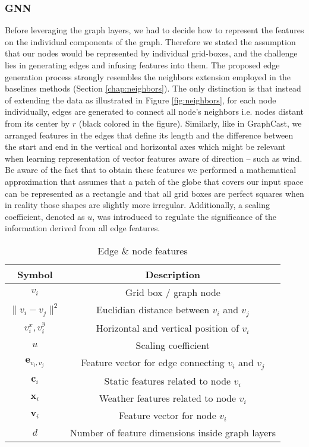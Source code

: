 \subsubsection{GNN}
Before leveraging the graph layers, we had to decide how to represent the features on the individual components of the graph. Therefore we stated the assumption that our nodes would be represented by individual grid-boxes, and the challenge lies in generating edges and infusing features into them. The proposed edge generation process strongly resembles the neighbors extension employed in the baselines methods (Section \ref{chap:neighbors}). The only distinction is that instead of extending the data as illustrated in Figure \ref{fig:neighbors}, for each node individually, edges are generated to connect all node's neighbors i.e. nodes distant from its center by $r$ (black colored in the figure). Similarly, like in GraphCast, we arranged features in the edges that define its length and the difference between the start and end in the vertical and horizontal axes which might be relevant when learning representation of vector features aware of direction -- such as wind. Be aware of the fact that to obtain these features we performed a mathematical approximation that assumes that a patch of the globe that covers our input space can be represented as a rectangle and that all grid boxes are perfect squares when in reality those shapes are slightly more irregular. Additionally, a scaling coefficient, denoted as $u$, was introduced to regulate the significance of the information derived from all edge features.
\renewcommand{\arraystretch}{1.25}
\begin{table}[!ht]
    \centering
    \begin{tabular}{|c|c|}
        \hline
        Symbol & Description \\
        \hline
        $v_{i}$ & Grid box / graph node\\
        $\|v_{i}-v_{j}\|^2$ & Euclidian distance between $v_i$ and $v_j$ \\
        $v_i^x,v_i^y$ & Horizontal and vertical position of $v_i$ \\
        $u$ & Scaling coefficient \\
        $\mathbf{e}_{v_i,v_j}$ & Feature vector for edge connecting $v_i$ and $v_j$ \\
        $\mathbf{c}_i$ & Static features related to node $v_i$ \\
        $\mathbf{x}_i$ & Weather features related to node $v_i$ \\
        $\mathbf{v}_i$ & Feature vector for node $v_i$ \\
        $d$ & Number of feature dimensions inside graph layers \\
        \hline
    \end{tabular}
\caption{Edge \& node features}
\label{tab:edge_conv}
\end{table}
